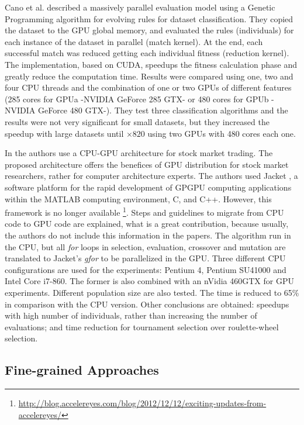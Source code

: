 \documentclass{comjnl}
\begin{document}
Cano et al. \cite{SpeedingTheEvaluationofGPCano:2012} described a massively parallel evaluation model using a Genetic Programming algorithm for evolving rules for dataset classification. They copied the dataset to the GPU global memory, and evaluated the rules (individuals) for each instance of the dataset in parallel (match kernel). At the end, each successful match was reduced getting each individual fitness (reduction kernel). The implementation, based on CUDA, speedups the fitness calculation phase and greatly reduce the computation time. Results were compared using one, two and four CPU threads and the combination of one or two GPUs of different features (285 cores for GPUa -NVIDIA GeForce 285 GTX- or 480 cores for GPUb -NVIDIA GeForce 480 GTX-). They test three classification algorithms and the results were not very significant for small datasets, but they increased the speedup with large datasets until $\times820$ using two GPUs with 480 cores each one.


In \cite{Contreras:2012:UGA:2150467.2150469} the authors use a CPU-GPU architecture for stock market trading. The proposed architecture offers the benefices of GPU distribution for stock market researchers, rather for computer architecture experts. The authors used Jacket \cite{jacket:Matlab}, a software platform for the rapid development of GPGPU computing applications within the MATLAB computing environment, C, and C++. However, this framework is no longer available \footnote{\url{http://blog.accelereyes.com/blog/2012/12/12/exciting-updates-from-accelereyes/}}. Steps and guidelines to migrate from CPU code to GPU code are explained, what is a great contribution, because usually, the authors do not include this information in the papers. The algorithm run in the CPU, but all  {\em for} loops in selection, evaluation, crossover and mutation are translated to Jacket's {\em gfor} to be parallelized in the GPU. Three different CPU configurations are used for the experiments: Pentium 4, Pentium SU41000 and Intel Core i7-860. The former is also combined with an nVidia 460GTX for GPU experiments. Different population size are also tested. The time is reduced to 65\% in comparison with the CPU version. Other conclusions are obtained: speedups with high number of individuals, rather than increasing the number of evaluations; and time reduction for  tournament selection  over roulette-wheel selection.

\subsection{Fine-grained Approaches}
\end{document}
